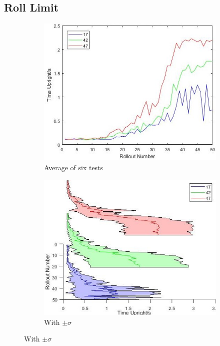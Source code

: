 \documentclass[twoside,twocolumn,12pt]{article}
\begin{document}
\subsection{Roll Limit}
\begin{figure}[ht!]
  \centering
  \begin{subfigure}[t]{0.325\textwidth}
    \includegraphics[width=\linewidth]{a2}
   \caption{Average of six tests}
  \label{fig:a}
  \end{subfigure}
  \begin{subfigure}[t]{0.325\textwidth}
    \includegraphics[width=\linewidth]{r2}
    \caption{With $\pm \sigma$}
  \label{fig:sd}

\end{subfigure}
\end{figure}
\end{document}
